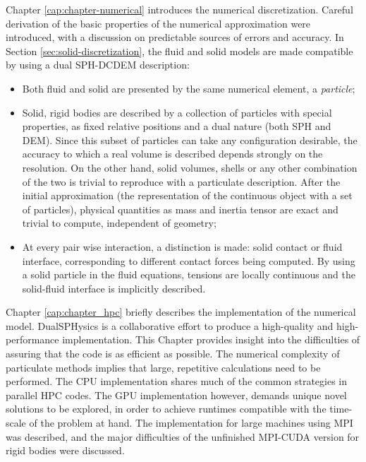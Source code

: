 Chapter \ref{cap:chapter-numerical} introduces the numerical discretization. Careful derivation of the basic properties of the numerical approximation were introduced, with a discussion on predictable sources of errors and accuracy. In Section \ref{sec:solid-discretization}, the fluid and solid models are made compatible by using a dual \ac{SPH}-\ac{DCDEM} description:
\begin{itemize}
\item Both fluid and solid are presented by the same numerical element, a \textit{particle};
\item Solid, rigid bodies are described by a collection of particles with special properties, as fixed relative positions and a dual nature (both \ac{SPH} and \ac{DEM}). Since this subset of particles can take any configuration desirable, the accuracy to which a real volume is described depends strongly on the resolution. On the other hand, solid volumes, shells or any other combination of the two is trivial to reproduce with a particulate description. After the initial approximation (the representation of the continuous object with a set of particles), physical quantities as mass and inertia tensor are exact and trivial to compute, independent of geometry;
\item At every pair wise interaction, a distinction is made: solid contact or fluid interface, corresponding to different contact forces being computed. By using a solid particle in the fluid equations, tensions are locally continuous and the solid-fluid interface is implicitly described.
\end{itemize}

Chapter \ref{cap:chapter_hpc} briefly describes the implementation of the numerical model. DualSPHysics is a collaborative effort to produce a high-quality and high-performance implementation. This Chapter provides insight into the difficulties of assuring that the code is as efficient as possible. The numerical complexity of particulate methods implies that large, repetitive calculations need to be performed. The \ac{CPU} implementation shares much of the common strategies in parallel \ac{HPC} codes. The \ac{GPU} implementation however, demands unique novel solutions to be explored, in order to achieve runtimes compatible with the time-scale of the problem at hand. The implementation for large machines using \ac{MPI} was described, and the major difficulties of the unfinished \ac{MPI}-\ac{CUDA} version for rigid bodies were discussed. \\


